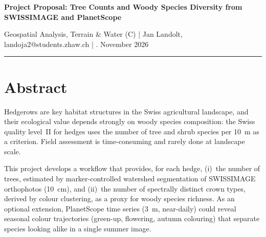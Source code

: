 \documentclass[10pt,a4paper]{article}
\begin{document}
\begin{flushleft}

{\LARGE\bfseries
Project Proposal:
Tree Counts and Woody Species Diversity
from SWISSIMAGE and PlanetScope
\par}

\vspace{7pt}

{\small
Geospatial Analysis, Terrain \& Water (C) \quad | \quad
Jan Landolt, landoja2@students.zhaw.ch \quad | . November 2026
}

\vspace{5pt}
\hrule

\end{flushleft}

\vspace{5pt}

\section*{Abstract}

Hedgerows are key habitat structures in the Swiss
agricultural landscape, and their ecological value
depends strongly on woody species composition: the
Swiss quality level~II for hedges uses the number of
tree and shrub species per 10~m as a criterion. Field
assessment is time-consuming and rarely done at
landscape scale.

This project develops a workflow that provides, for
each hedge, (i)~the number of trees, estimated by
marker-controlled watershed segmentation of SWISSIMAGE
orthophotos (10~cm), and (ii)~the number of spectrally
distinct crown types, derived by colour clustering, as
a proxy for woody species richness. As an optional
extension, PlanetScope time series (3~m, near-daily)
could reveal seasonal colour trajectories (green-up,
flowering, autumn colouring) that separate species
looking alike in a single summer image.
\vspace{3pt}
\end{document}
